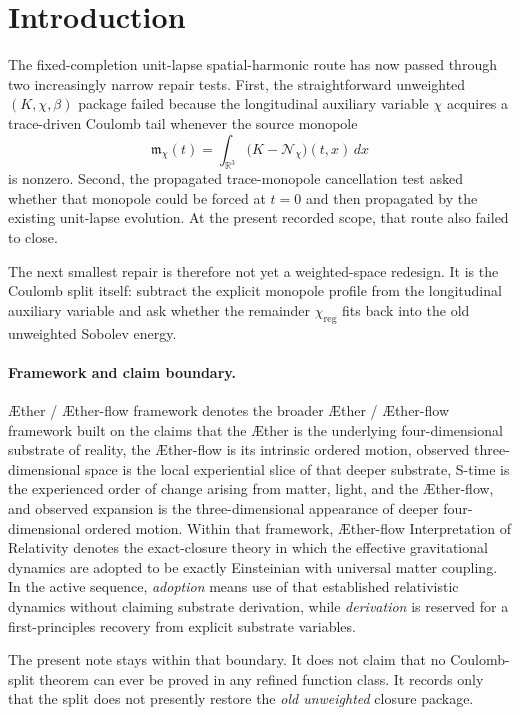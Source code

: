\documentclass[11pt]{article}
\newcommand{\Aether}{\AE{}ther}
\newcommand{\Aflow}{\AE{}ther-flow}
\newcommand{\TheoryName}{\Aflow{} Interpretation of Relativity}
\newcommand{\TheoryProgram}{\Aether{} / \Aflow{} framework}
\begin{document}
\section{Introduction}

The fixed-completion unit-lapse spatial-harmonic route has now passed through two increasingly narrow repair tests. First, the straightforward unweighted \((K,\chi,\beta)\) package failed because the longitudinal auxiliary variable \(\chi\) acquires a trace-driven Coulomb tail whenever the source monopole
\[
\mathfrak m_\chi(t)
=
\int_{\mathbb R^3}\bigl(K-\mathcal N_\chi\bigr)(t,x)\,dx
\]
is nonzero. Second, the propagated trace-monopole cancellation test asked whether that monopole could be forced at \(t=0\) and then propagated by the existing unit-lapse evolution. At the present recorded scope, that route also failed to close.

The next smallest repair is therefore not yet a weighted-space redesign. It is the Coulomb split itself: subtract the explicit monopole profile from the longitudinal auxiliary variable and ask whether the remainder \(\chi_{\mathrm{reg}}\) fits back into the old unweighted Sobolev energy.

\paragraph{Framework and claim boundary.}
\TheoryProgram{} denotes the broader \Aether{} / \Aflow{} framework built on the claims that the \Aether{} is the underlying four-dimensional substrate of reality, the \Aflow{} is its intrinsic ordered motion, observed three-dimensional space is the local experiential slice of that deeper substrate, S-time is the experienced order of change arising from matter, light, and the \Aflow{}, and observed expansion is the three-dimensional appearance of deeper four-dimensional ordered motion. Within that framework, \TheoryName{} denotes the exact-closure theory in which the effective gravitational dynamics are adopted to be exactly Einsteinian with universal matter coupling. In the active sequence, \emph{adoption} means use of that established relativistic dynamics without claiming substrate derivation, while \emph{derivation} is reserved for a first-principles recovery from explicit substrate variables.

The present note stays within that boundary. It does not claim that no Coulomb-split theorem can ever be proved in any refined function class. It records only that the split does not presently restore the \emph{old unweighted} closure package.
\end{document}
